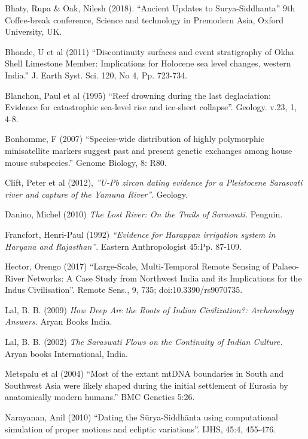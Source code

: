 \begin{thebibliography}{99}
 Bhaty, Rupa \& Oak, Nilesh (2018). “Ancient Updates to Surya-Siddhanta” 9th Coffee-break conference, Science and technology in Premodern Asia, Oxford University, UK.

  Bhonde, U et al (2011) “Discontinuity surfaces and event stratigraphy of Okha Shell Limestone Member: Implications for Holocene sea level changes, western India.” J. Earth Syst. Sci. 120, No 4, Pp. 723-734.

  Blanchon, Paul et al (1995) “Reef drowning during the last deglaciation: Evidence for catastrophic sea-level rise and ice-sheet collapse”. Geology. v.23, 1, 4-8.

  Bonhomme, F (2007) “Species-wide distribution of highly polymorphic minisatellite markers suggest past and present genetic exchanges among house mouse subspecies.” Genome Biology, 8: R80.

  Clift, Peter et al (2012), \textit{”U-Pb zircon dating evidence for a Pleistocene Sarasvati river and capture of the Yamuna River”}. Geology.

  Danino, Michel (2010) \textit{The Lost River: On the Trails of Sarasvati.} Penguin.

  Francfort, Henri-Paul (1992) \textit{“Evidence for Harappan irrigation system in Haryana and Rajasthan”}. Eastern Anthropologist 45:Pp. 87-109.

  Hector, Orengo (2017) “Large-Scale, Multi-Temporal Remote Sensing of Palaeo-River Networks: A Case Study from Northwest India and its Implications for the Indus Civilisation”. Remote Sens., 9, 735; doi:10.3390/rs9070735.

  Lal, B. B. (2009) \textit{How Deep Are the Roots of Indian Civilization?: Archaeology Answers.} Aryan Books India.

  Lal, B. B. (2002) \textit{The Saraswati Flows on the Continuity of Indian Culture.} Aryan books International, India.

  Metspalu et al (2004) “Most of the extant mtDNA boundaries in South and Southwest Asia were likely shaped during the initial settlement of Eurasia by anatomically modern humans.” BMC Genetics 5:26.

  Narayanan, Anil (2010) “Dating the Sūrya-Siddhānta using computational simulation of proper motions and ecliptic variations”. IJHS, 45:4, 455-476.


\end{thebibliography}
